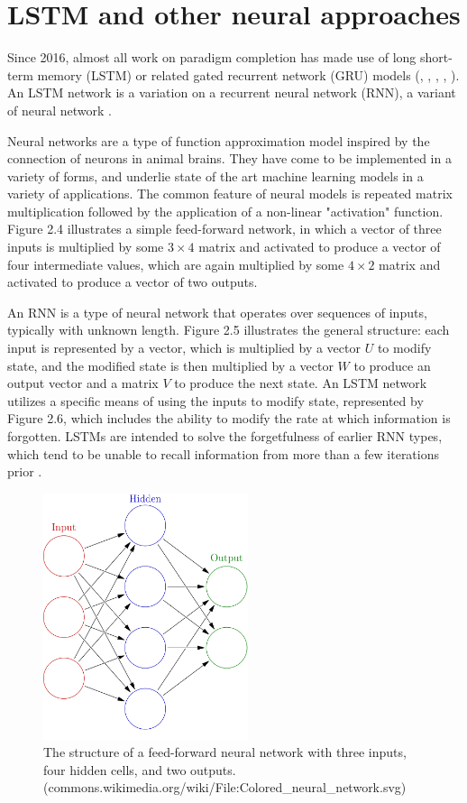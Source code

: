 \section{LSTM and other neural approaches}

Since 2016, almost all work on paradigm completion has made use of long short-term memory (LSTM) or related gated recurrent network (GRU) models (\cite{Faruqui2015}, \cite{Cotterell2016}, \cite{Cotterell2017a}, \cite{Cotterell2018b}, \cite{McCarthy2019}). An LSTM network is a variation on a recurrent neural network (RNN), a variant of neural network \parencite{Hochreiter1997}.

Neural networks are a type of function approximation model inspired by the connection of neurons in animal brains. They have come to be implemented in a variety of forms, and underlie state of the art machine learning models in a variety of applications. The common feature of neural models is repeated matrix multiplication followed by the application of a non-linear "activation" function. Figure 2.4 illustrates a simple feed-forward network, in which a vector of three inputs is multiplied by some $3 \times 4$ matrix and activated to produce a vector of four intermediate values, which are again multiplied by some $4 \times 2$ matrix and activated to produce a vector of two outputs.

An RNN is a type of neural network that operates over sequences of inputs, typically with unknown length. Figure 2.5 illustrates the general structure: each input is represented by a vector, which is multiplied by a vector $U$ to modify state, and the modified state is then multiplied by a vector $W$ to produce an output vector and a matrix $V$ to produce the next state. An LSTM network utilizes a specific means of using the inputs to modify state, represented by Figure 2.6, which includes the ability to modify the rate at which information is forgotten. LSTMs are intended to solve the forgetfulness of earlier RNN types, which tend to be unable to recall information from more than a few iterations prior \parencite{Hochreiter1997}.

\begin{figure}[t]
\includegraphics[width=6cm]{images/1000px-Colored_neural_network.png}
\centering
\caption{The structure of a feed-forward neural network with three inputs, four hidden cells, and two outputs. (commons.wikimedia.org/wiki/File:Colored\_neural\_network.svg)}
\end{figure}

